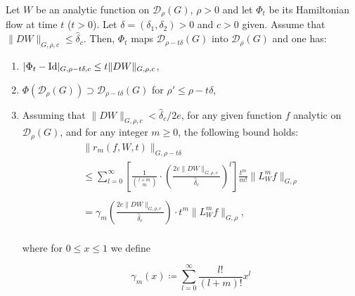 \begin{lemma}\label{lemma:1.2} Let $W$ be an analytic function on $\mathcal{D}_\rho(G)$, $\rho > 0$ and let $\Phi_t$ be its Hamiltonian flow at time $t$ ($t>0$). Let $\delta=(\delta_1,\delta_2)>0$ and $c>0$ given. Assume that $\|DW\|_{G,\rho,c}\leq \hat\delta_c$. Then, $\Phi_t$ maps $\mathcal{D}_{\rho-t\delta}(G)$ into $\mathcal{D}_{\rho}(G)$ and one has:
\begin{enumerate}
\item $|\Phi_t-\text{Id}|_{G,\rho-t\delta,c}\leq t \|DW\|_{G,\rho,c}$,
\item $\Phi(\mathcal{D}_{\rho}(G)) \supset \mathcal{D}_{\rho-t\delta}(G)$ for $\rho'\leq \rho-t\delta$,
\item Assuming that $\|DW\|_{G,\rho,c} < \hat\delta_c/2e$, for any given function $f$ analytic on $\mathcal{D}_\rho(G)$, and for any integer $m\geq 0$, the following bound holds:
$$
\begin{array}{lcl}
\|r_m(f,W,t)\|_{G,\rho-t\delta} \\
 \leq  \displaystyle \sum_{l= 0}^\infty \left[\frac{1}{\binom{l+m}{m}}\cdot \left(\frac{2e\|DW\|_{G,\rho,c}}{\hat\delta_c}\right)^l\right]\frac{t^m}{m!}\|L_W^m f\|_{G,\rho}\\
\\
 =  \displaystyle\gamma_m\left(\frac{2e\|DW\|_{G,\rho,c}}{\hat\delta_c}\right)\cdot t^m \|L_W^m f\|_{G,\rho},\\
\end{array}
$$

where for $0\leq x \leq 1$ we define

$$\gamma_m (x) \coloneqq \sum_{l=0}^\infty \frac{l!}{(l+m)!} x^l$$

\end{enumerate}
\end{lemma}
